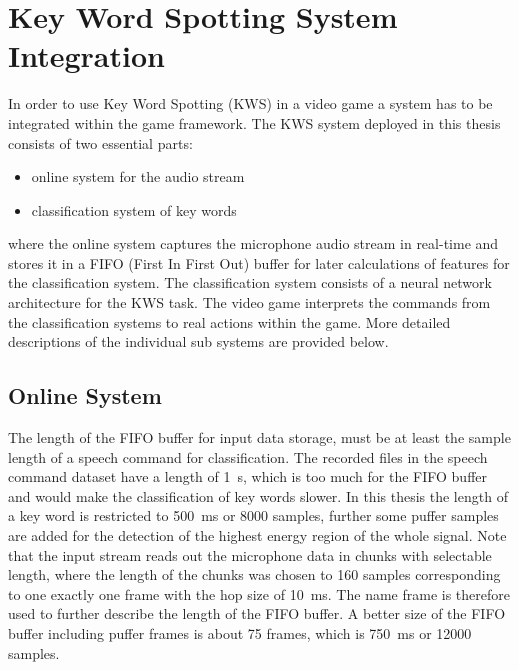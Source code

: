 
\section{Key Word Spotting System Integration}
\thesisStateNotReady
In order to use Key Word Spotting (KWS) in a video game a system has to be integrated within the game framework.
The KWS system deployed in this thesis consists of two essential parts:
\begin{itemize}
	\item online system for the audio stream
	\item classification system of key words
\end{itemize}
where the online system captures the microphone audio stream in real-time and stores it in a FIFO (First In First Out) buffer for later calculations of features for the classification system.
The classification system consists of a neural network architecture for the KWS task.
The video game interprets the commands from the classification systems to real actions within the game.
More detailed descriptions of the individual sub systems are provided below.



\subsection{Online System}
The length of the FIFO buffer for input data storage, must be at least the sample length of a speech command for classification.
The recorded files in the speech command dataset have a length of \SI{1}{\second}, which is too much for the FIFO buffer and would make the classification of key words slower.
In this thesis the length of a key word is restricted to \SI{500}{\milli\second} or 8000 samples, further some puffer samples are added for the detection of the highest energy region of the whole signal.
Note that the input stream reads out the microphone data in chunks with selectable length, where the length of the chunks was chosen to 160 samples corresponding to one exactly one frame with the hop size of \SI{10}{\milli\second}.
The name frame is therefore used to further describe the length of the FIFO buffer.
A better size of the FIFO buffer including puffer frames is about 75 frames, which is \SI{750}{\milli\second} or 12000 samples.

